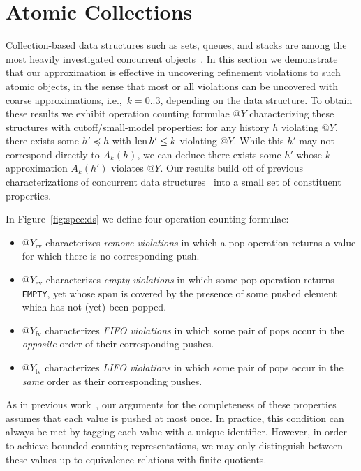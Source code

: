 \section{Atomic Collections}
\label{sec:containers}

Collection-based data structures such as sets, queues, and stacks are among the
most heavily investigated concurrent objects~\cite{chapter/cds/MoirS07}. In
this section we demonstrate that our approximation is effective in uncovering
refinement violations to such atomic objects, in the sense that most or all violations
can be uncovered with coarse approximations, i.e.,~$k=0..3$, depending on the
data structure. To obtain these results we exhibit operation counting formulae
$@Y$ characterizing these structures with cutoff/small-model properties: for
any history $h$ violating $@Y$, there exists some $h' \preceq h$ with $\operatorname{len} h' \le k$ violating
$@Y$. While this $h'$ may not correspond directly to $A_k(h)$, we can deduce
there exists some $h'$ whose $k$-approximation $A_k(h')$ violates $@Y$. Our
results build off of previous characterizations of concurrent data
structures~\cite{conf/tacas/AbdullaHHJR13, conf/concur/HenzingerSV13} into a
small set of constituent properties.

In Figure~\ref{fig:spec:ds} we define four operation counting formulae:
\begin{itemize}

  \item $@Y_\mathrm{rv}$ characterizes \emph{remove violations} in which a
  {\sf pop} operation returns a value for which there is no corresponding {\sf
  push}.

  \item $@Y_\mathrm{ev}$ characterizes \emph{empty violations} in which some
  {\sf pop} operation returns {\tt EMPTY}, yet whose span is covered by the
  presence of some {\sf push}ed element which has not (yet) been {\sf pop}ped.

  \item $@Y_\mathrm{fv}$ characterizes \emph{FIFO violations} in which some
  pair of {\sf pop}s occur in the \emph{opposite} order of their corresponding
  {\sf push}es.

  \item $@Y_\mathrm{lv}$ characterizes \emph{LIFO violations} in which some
  pair of {\sf pop}s occur in the \emph{same} order as their corresponding {\sf
  push}es.

\end{itemize}
As in previous work~\cite{conf/tacas/AbdullaHHJR13, conf/concur/HenzingerSV13},
our arguments for the completeness of these properties assumes that each value
is {\sf push}ed at most once. In practice, this condition can always be met by
tagging each value with a unique identifier. However, in order to achieve
bounded counting representations, we may only distinguish between these values
up to equivalence relations with finite quotients.


